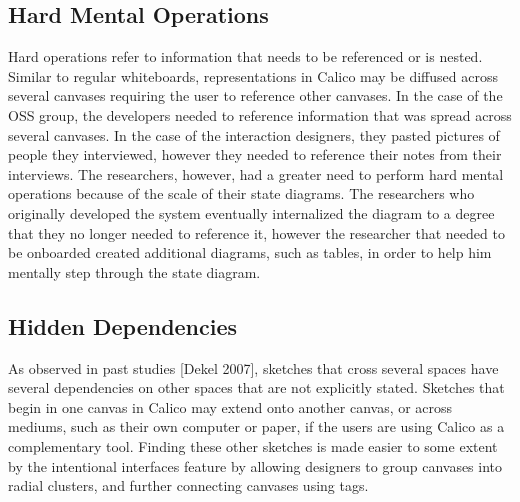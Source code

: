 \subsection{Hard Mental Operations}
Hard operations refer to information that needs to be referenced or is nested. Similar to regular whiteboards, representations in Calico may be diffused across several canvases requiring the user to reference other canvases. In the case of the OSS group, the developers needed to reference information that was spread across several canvases. In the case of the interaction designers, they pasted pictures of people they interviewed, however they needed to reference their notes from their interviews. The researchers, however, had a greater need to perform hard mental operations because of the scale of their state diagrams. The researchers who originally developed the system eventually internalized the diagram to a degree that they no longer needed to reference it, however the researcher that needed to be onboarded created additional diagrams, such as tables, in order to help him mentally step through the state diagram.


%

\subsection{Hidden Dependencies}
As observed in past studies [Dekel 2007], sketches that cross several spaces have several dependencies on other spaces that are not explicitly stated. Sketches that begin in one canvas in Calico may extend onto another canvas, or across mediums, such as their own computer or paper, if the users are using Calico as a complementary tool. Finding these other sketches is made easier to some extent by the intentional interfaces feature by allowing designers to group canvases into radial clusters, and further connecting canvases using tags. 

